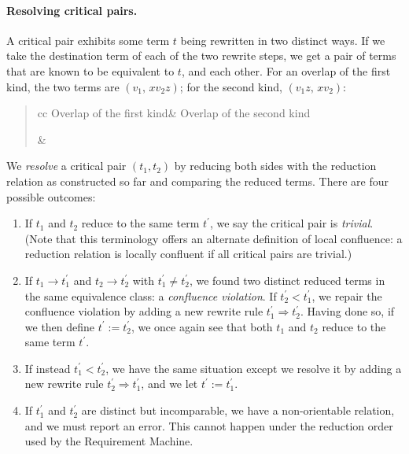 \documentclass[../generics]{subfiles}
\begin{document}
\paragraph{Resolving critical pairs.} 
A critical pair exhibits some term $t$ being rewritten in two distinct ways. If we take the destination term of each of the two rewrite steps, we get a pair of terms that are known to be equivalent to $t$, and each other. For an overlap of the first kind, the two terms are $(v_1,\,xv_2z)$; for the second kind, $(v_1z,\,xv_2)$:
\begin{quote}
\begin{tabular}{cc}
Overlap of the first kind&
Overlap of the second kind\\
&
\end{tabular}
\end{quote}
 We \emph{resolve} a critical pair $(t_1,t_2)$ by reducing both sides with the reduction relation as constructed so far and comparing the reduced terms. There are four possible outcomes:
\begin{enumerate}
\item If $t_1$ and $t_2$ reduce to the same term $t^\prime$, we say the critical pair is \emph{trivial}. (Note that this terminology offers an alternate definition of local confluence: a reduction relation is locally confluent if all critical pairs are trivial.)
\item If $t_1\rightarrow t_1^\prime$ and $t_2\rightarrow t_2^\prime$ with $t_1^\prime\neq t_2^\prime$, we found two distinct reduced terms in the same equivalence class: a \emph{confluence violation}. If $t_2^\prime < t_1^\prime$, we repair the confluence violation by adding a new rewrite rule $t_1^\prime\Rightarrow t_2^\prime$. Having done so, if we then define $t^\prime:=t_2^\prime$, we once again see that both $t_1$ and $t_2$ reduce to the same term $t^\prime$.

\item If instead $t_1^\prime<t_2^\prime$, we have the same situation except we resolve it by adding a new rewrite rule $t_2^\prime\Rightarrow t_1^\prime$, and we let $t^\prime:=t_1^\prime$.

\item If $t_1^\prime$ and $t_2^\prime$ are distinct but incomparable, we have a non-orientable relation, and we must report an error. This cannot happen under the reduction order used by the Requirement Machine.
\end{enumerate}
\end{document}
